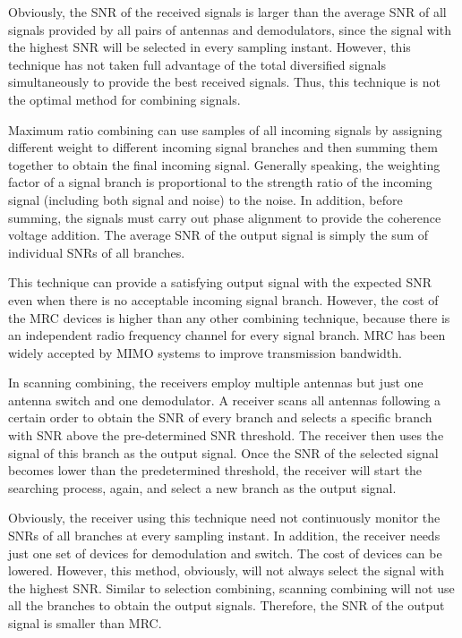 Obviously, the SNR of the received signals is larger than the
average SNR of all signals provided by all pairs of antennas and
demodulators, since the signal with the highest SNR will be selected
in every sampling instant. However, this technique has not taken
full advantage of the total diversified signals simultaneously to
provide the best received signals. Thus, this technique is not the
optimal method for combining signals.

Maximum ratio combining can use samples of all incoming signals by
assigning different weight to different incoming signal branches and
then summing them together to obtain the final incoming signal.
Generally speaking, the weighting factor of a signal branch is
proportional to the strength ratio of the incoming signal (including
both signal and noise) to the noise. In addition, before summing,
the signals must carry out phase alignment to provide the coherence
voltage addition. The average SNR of the output signal is simply the
sum of individual SNRs of all branches.

This technique can provide a satisfying output signal with the
expected SNR even when there is no acceptable incoming signal
branch. However, the cost of the MRC devices is higher than any
other combining technique, because there is an independent radio
frequency channel for every signal branch. MRC has been widely
accepted by MIMO systems to improve transmission bandwidth.

In scanning combining, the receivers employ multiple antennas but
just one antenna switch and one demodulator. A receiver scans all
antennas following a certain order to obtain the SNR of every branch
and selects a specific branch with SNR above the pre-determined SNR
threshold. The receiver then uses the signal of this branch as the
output signal. Once the SNR of the selected signal becomes lower
than the predetermined threshold, the receiver will start the
searching process, again, and select a new branch as the output
signal.

Obviously, the receiver using this technique need not continuously
monitor the SNRs of all branches at every sampling instant. In
addition, the receiver needs just one set of devices for
demodulation and switch. The cost of devices can be lowered.
However, this method, obviously, will not always select the signal
with the highest SNR. Similar to  selection combining, scanning
combining will not use all the branches to obtain the output
signals. Therefore, the SNR of the output signal is smaller than
MRC.


